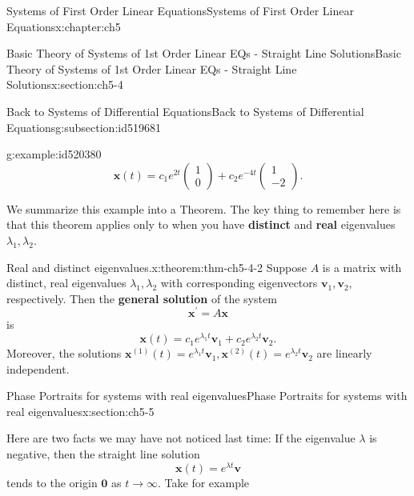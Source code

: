 \documentclass[oneside,10pt,]{book}
\newcommand{\terminology}[1]{\textbf{#1}}
\numberwithin{equation}{section}
\numberwithin{equation}{section}
\begin{document}
\begin{chapterptx}{Systems of First Order Linear Equations}{}{Systems of First Order Linear Equations}{}{}{x:chapter:ch5}
\begin{sectionptx}{Basic Theory of Systems of 1st Order Linear EQs - Straight Line Solutions}{}{Basic Theory of Systems of 1st Order Linear EQs - Straight Line Solutions}{}{}{x:section:ch5-4}
\begin{subsectionptx}{Back to Systems of Differential Equations}{}{Back to Systems of Differential Equations}{}{}{g:subsection:id519681}
\begin{example}{}{g:example:id520380}
\begin{equation*}
\mathbf{x}(t)=c_{1}e^{2t}\left(\begin{array}{c}
1\\
0
\end{array}\right)+c_{2}e^{-4t}\left(\begin{array}{c}
1\\
-2
\end{array}\right).
\end{equation*}
%
\end{example}
We summarize this example into a Theorem. The key thing to remember here is that this theorem applies only to when you have \terminology{distinct} and \terminology{real} eigenvalues \(\lambda_{1},\lambda_{2}\).%
\begin{theorem}{Real and distinct eigenvalues.}{}{x:theorem:thm-ch5-4-2}%
Suppose \(A\) is a matrix with distinct, real eigenvalues \(\lambda_{1},\lambda_{2}\) with corresponding eigenvectors \(\mathbf{v}_{1},\mathbf{v}_{2}\), respectively. Then the \terminology{general solution} of the system%
\begin{equation*}
\mathbf{x}^{\prime}=A\mathbf{x}
\end{equation*}
is%
\begin{equation*}
\mathbf{x}(t)=c_{1}e^{\lambda_{1}t}\mathbf{v}_{1}+c_{2}e^{\lambda_{2}t}\mathbf{v}_{2}.
\end{equation*}
Moreover, the solutions \(\mathbf{x}^{(1)}(t)=e^{\lambda_{1}t}\mathbf{v}_{1},\mathbf{x}^{(2)}(t)=e^{\lambda_{2}t}\mathbf{v}_{2}\) are linearly independent.%
\end{theorem}
\end{subsectionptx}
\end{sectionptx}
%
%
\typeout{************************************************}
\typeout{************************************************}
%
\begin{sectionptx}{Phase Portraits for systems with real eigenvalues}{}{Phase Portraits for systems with real eigenvalues}{}{}{x:section:ch5-5}
\begin{introduction}{}%
Here are two facts we may have not noticed last time: If the eigenvalue \(\lambda\) is negative, then the straight line solution%
\begin{equation*}
\mathbf{x}(t)=e^{\lambda t}\mathbf{v}
\end{equation*}
tends to the origin \(\mathbf{0}\) as \(t\to\infty\). Take for example%
\begin{equation*}

\end{equation*}
\end{introduction}
\end{sectionptx}
\end{chapterptx}
\end{document}
